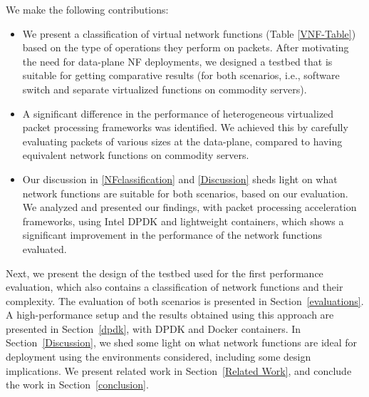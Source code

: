 \documentclass[conference]{IEEEtran}
\begin{document}
We make the following contributions:
\begin{itemize}
    \item We present a classification of virtual network functions (Table \ref{VNF-Table}) based on the type of operations they perform on packets. After motivating the need for data-plane NF deployments, we designed a testbed that is suitable for getting comparative results (for both scenarios, i.e., software switch and separate virtualized functions on commodity servers).
    
    \item A significant difference in the performance of heterogeneous virtualized packet processing frameworks was identified. We achieved this by carefully evaluating packets of various sizes at the data-plane, compared to having equivalent network functions on commodity servers. 
    
    \item Our discussion in \cref{NFclassification} and \cref{Discussion} sheds light on what network functions are suitable for both scenarios, based on our evaluation. We analyzed and presented our findings, with packet processing acceleration frameworks, using Intel DPDK and lightweight containers, which shows a significant improvement in the performance of the network functions evaluated.
\end{itemize}

Next, we present the design of the testbed used for the first performance evaluation, which also contains a classification of network functions and their complexity. The evaluation of both scenarios is presented in Section~\ref{evaluations}. A high-performance setup and the results obtained using this approach are presented in Section~\ref{dpdk}, with DPDK and Docker containers. In Section~\ref{Discussion}, we shed some light on what network functions are ideal for deployment using the environments considered, including some design implications. We present related work in Section~\ref{Related Work}, and conclude the work in Section~\ref{conclusion}. 
\end{document}
